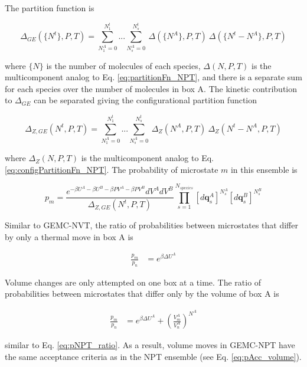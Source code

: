 The partition function is

\begin{equation}
\Delta_{GE}\left(\{N^t\},P,T\right) = \sum^{N^t_1}_{N^A_1=0} ... \sum^{N^t_s}_{N^A_s=0} 
                                    \ \Delta(\{N^A\},P,T)\ \Delta(\{N^t-N^A\},P,T)
\label{eq:partitionFn_GENPT}
\end{equation}

where $\{N\}$ is the number of molecules of each species,
$\Delta({N},P,T)$ is the multicomponent analog to Eq. \ref{eq:partitionFn_NPT}, and
there is a separate sum for each species over the number of molecules in box A.
The kinetic contribution to $\Delta_{GE}$ can be separated giving the configurational partition function

\begin{equation}
\Delta_{Z,GE}\left({N^t},P,T\right) = \sum^{N^t_1}_{N^A_1=0} ... \sum^{N^t_s}_{N^A_s=0} 
                                    \ \Delta_Z({N^A},P,T)\ \Delta_Z({N^t-N^A},P,T)
\label{eq:configPartitionFn_GENPT}
\end{equation}

where $\Delta_Z({N},P,T)$ is the multicomponent analog to Eq. \ref{eq:configPartitionFn_NPT}.
The probability of microstate $m$ in this ensemble is

\begin{equation}
p_m = \frac{e^{-\beta U^A -\beta U^B - \beta P V^A - \beta P V^B} dV^A dV^B}{\Delta_{Z,GE}({N^t},P,T)} 
      \prod_{s=1}^{N_{species}} \left[ d\mathbf{q}_s^{A} \right]^{N_s^A}
                                \left[ d\mathbf{q}_s^{B} \right]^{N_s^B}
\label{eq:pGENPT}
\end{equation}

Similar to GEMC-NVT, the ratio of probabilities between microstates that differ by only a thermal move in box A is

\begin{align}
\frac{p_m}{p_n}&= e^{\beta \Delta U^A}
\end{align}

Volume changes are only attempted on one box at a time. 
The ratio of probabilities between microstates that differ only by the volume of box A is

\begin{align}
\frac{p_m}{p_n}&= e^{\beta \Delta U^A} + \left( \frac{V^A_m}{V^A_n} \right)^{N^A}
\end{align}

similar to Eq. \ref{eq:pNPT_ratio}. 
As a result, volume moves in GEMC-NPT have the same acceptance criteria as in the NPT ensemble (see Eq. \ref{eq:pAcc_volume}).

